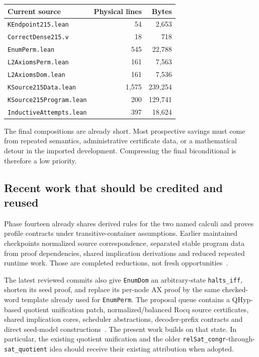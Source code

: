 \documentclass[11pt,letterpaper]{article}
\theoremstyle{definition}\newtheorem{definition}[theorem]{Definition}
\newcommand{\code}[1]{\texttt{#1}}
\begin{document}
\begin{center}\small
\begin{tabular}{lrr}
\toprule
Current source & Physical lines & Bytes \\
\midrule
\code{KEndpoint215.lean} & 54 & 2,653 \\
\code{CorrectDense215.v} & 18 & 718 \\
\code{EnumPerm.lean} & 545 & 22,788 \\
\code{L2AxiomsPerm.lean} & 161 & 7,563 \\
\code{L2AxiomsDom.lean} & 161 & 7,536 \\
\code{KSource215Data.lean} & 1,575 & 239,254 \\
\code{KSource215Program.lean} & 200 & 129,741 \\
\code{InductiveAttempts.lean} & 397 & 18,624 \\
\bottomrule
\end{tabular}
\end{center}

The final compositions are already short. Most prospective savings must come from
repeated semantics, administrative certificate data, or a mathematical detour in
the imported development. Compressing the final biconditional is therefore a low
priority.

\subsection{Recent work that should be credited and reused}

Phase fourteen already shares derived rules for the two named calculi and proves
profile contracts under transitive-container assumptions. Earlier maintained
checkpoints normalized source correspondence, separated stable program data from
proof dependencies, shared implication derivations and reduced repeated runtime
work. Those are completed reductions, not fresh opportunities~\cite{phase14}.

The latest reviewed commits also give \code{EnumDom} an arbitrary-state
\code{halts\_iff}, shorten its seed proof, and replace its per-node AX proof by the
same checked-word template already used for \code{EnumPerm}. The proposal queue
contains a QHyp-based quotient unification patch, normalized/balanced Rocq source
certificates, shared implication cores, scheduler abstractions, decoder-prefix
contracts and direct seed-model constructions~\cite{history,proposals,quotient}.
The present work builds on that state. In particular, the existing quotient
unification and the older \code{relSat\_congr}-through-\code{sat\_quotient} idea
should receive their existing attribution when adopted.
\end{document}

